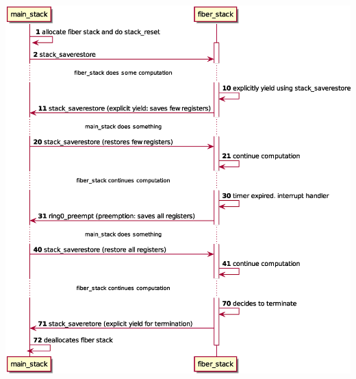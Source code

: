 \documentclass[]{article}
\begin{document}
\includegraphics{plantuml-images/89fb4cb77a4c4ab7b33f32c88bfaccb7b8715408.eps}
\end{document}
